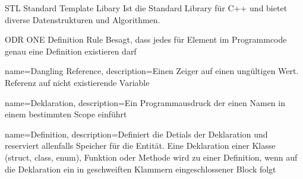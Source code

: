 {STL}
{Standard Template Libary}
{
	 Ist die Standard Library für C++ und bietet diverse Datenstrukturen und Algorithmen.
}

{ODR}
{ONE Definition Rule}
{
	Besagt, dass jedes für Element im Programmcode genau eine Definition existieren darf
}

{
	name={Dangling Reference},
	description={Einen Zeiger auf einen ungültigen Wert. Referenz auf nicht existierende Variable}
}

{
	name={Deklaration},
	description={Ein Programmausdruck der einen Namen in einem bestimmten Scope einführt}
}

{
	name={Definition},
	description={Definiert die Detials der Deklaration und reserviert allenfalls Speicher für die Entität. Eine Deklaration einer Klasse (struct, class, enum), Funktion oder Methode wird zu einer Definition, wenn auf die Deklaration ein in geschweiften Klammern eingeschlossener Block folgt}
}
